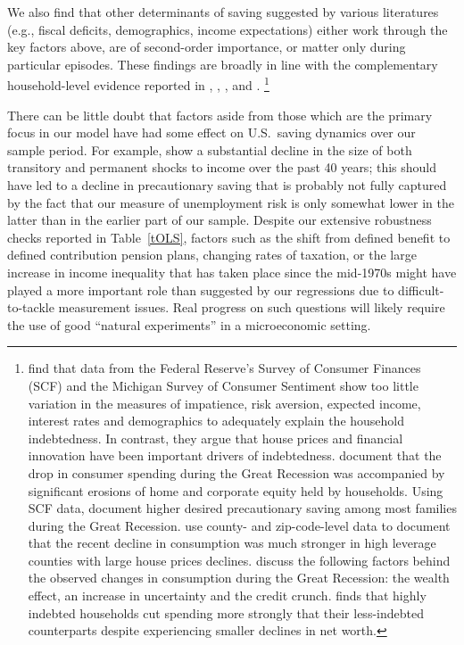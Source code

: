 \documentclass[titlepage]{\econtex}
\begin{document}
We also find that other determinants of saving suggested by various literatures (e.g.,
fiscal deficits, demographics, income expectations) either work
through the key factors above, are of second-order importance, or
matter only during particular episodes. These findings are broadly in
line with the complementary household-level evidence reported in
\cite{dynanKohn07_indebtedness},
\cite{moorePalumbo_financesOfUShouseholds},
\cite{brickerEtAl_storm}, \cite{mianRaoSufi_hhBalanceSheets} and \cite{petevEtAl_cAndGreatRecession}.%
\footnote{  \cite{dynanKohn07_indebtedness} find that data from the Federal
  Reserve's Survey of Consumer Finances (SCF) and the Michigan Survey
  of Consumer Sentiment show too little variation in the measures of
  impatience, risk aversion, expected income, interest rates and
  demographics to adequately explain the household indebtedness. In
  contrast, they argue that house prices and financial innovation have
  been important drivers of
  indebtedness. \cite{moorePalumbo_financesOfUShouseholds} document
  that the drop in consumer spending during the Great Recession was
  accompanied by significant erosions of home and corporate equity
  held by households. Using SCF data, \cite{brickerEtAl_storm}
  document higher desired precautionary saving among most families
  during the Great Recession.  \cite{mianRaoSufi_hhBalanceSheets} use county- and zip-code-level data
  to document that the recent decline in consumption was much stronger in high leverage counties with large house prices declines.
  \cite{petevEtAl_cAndGreatRecession} discuss the following factors
  behind the observed changes in consumption during the Great Recession: the wealth effect, an increase in uncertainty and the credit crunch.
  \cite{dynan_debtOverhang} finds that highly indebted households cut spending more strongly that their less-indebted counterparts despite
  experiencing smaller declines in net worth.
  }

There can be little doubt that factors aside from those which are the primary focus in our model have had some effect on U.S.\ saving dynamics over our sample
period.  For example, \cite{ssModeration} show a substantial decline in the size of both transitory and permanent shocks to income over the past 40 years;
 this should have led to a decline in precautionary saving that is probably not fully captured by the fact that our measure
 of unemployment risk is only somewhat lower in the latter than in the earlier part of our sample.  Despite our extensive robustness checks reported
 in Table~\ref{tOLS}, factors such as the shift from defined benefit to defined contribution pension plans, changing rates of taxation,
 or the large increase in income inequality that has taken place since the mid-1970s might have played a more important role than suggested
 by our regressions due to difficult-to-tackle measurement issues. Real progress on such questions will likely require the use of good ``natural experiments'' in a microeconomic setting.
\end{document}

